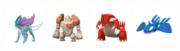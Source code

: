 \documentclass[12pt]{beamer}
\begin{document}
\begin{frame}
\begin{footnotesize}
\begin{block}{}
\begin{center}
    \includegraphics[width=1.5cm]{../../images/pokemon/suicune}
    \includegraphics[width=1.5cm]{../../images/pokemon/regirock}
    \includegraphics[width=1.5cm]{../../images/pokemon/groudon}
    \includegraphics[width=1.5cm]{../../images/pokemon/kyogre}
\end{center}
\end{block}

\end{footnotesize}
\end{frame}



\end{document}
